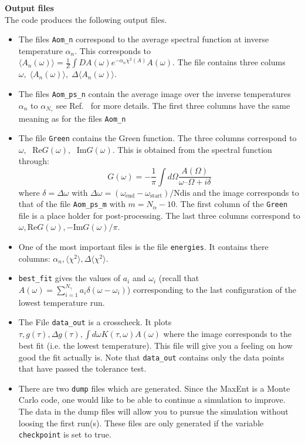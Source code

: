 \noindent
\textbf{Output files} \\
The code produces  the following output files.
\begin{itemize}
\item The files  \texttt{Aom\_n}  correspond to the average spectral function at inverse  temperature  $ \alpha_n $. This corresponds to
$  \langle A_n(\omega) \rangle =   \frac{1}{Z}   \int DA(\omega)    e^{-\alpha_n \chi^{2}(A)  } A(\omega). $
The file contains three colums  $ \omega, \;  \langle A_n(\omega) \rangle , \;  \Delta \langle A_n(\omega) \rangle $.

\item The files \texttt{Aom\_ps\_n}   contain the average image over  the  inverse   temperatures  $ \alpha_n $ to $ \alpha_{N_\gamma} $  see Ref.~\cite{Beach04a} for more details.   
 The first three columns have the same meaning as for the files \texttt{Aom\_n}

\item The file \texttt{Green} contains the Green function. The three columns correspond to $ \omega, \;   \text{ Re} G(\omega), \;  \text{  Im} G(\omega)  $.  This is obtained from the spectral function through:
\begin{equation}
 G(\omega) =  -\frac{1}{\pi} \int d \Omega   \frac{A(\Omega)}{\omega – \Omega + i \delta}
 \end{equation}
where  $ \delta =  \Delta \omega$ with $ \Delta \omega = (\omega_\text{end} -  \omega_\text{start})/\text{Ndis}$ and the image corresponds to that of the file \texttt{Aom\_ps\_m} with $ m = N_{\alpha} -10 $. 
The first column of the  \texttt{Green}  file is a place holder for post-processing. The last three columns   correspond to $\omega, \text{Re} G(\omega) ,   - \text{Im} G(\omega)/\pi $. 

\item  One of the most important files is the file  \texttt{energies}. It contains there columns:  $ \alpha_n, \langle \chi^2 \rangle, \Delta \langle \chi^2 \rangle $.

\item   \texttt{best\_fit}  gives the values of $a_i$ and $\omega_i$   (recall that $ A(\omega)  = \sum_{i=1}^{N_{\gamma}} a_{i} \delta \left( \omega - \omega_i \right)$) corresponding to the last configuration of the  lowest temperature run.

\item  The File \texttt{data\_out}  is a crosscheck. It plots   $ \tau,  g(\tau),  \Delta g(\tau), \int d \omega  K(\tau, \omega) A(\omega) $ where the image  corresponds to the best fit (i.e. the lowest temperature). 
This file will give you  a feeling on how good the fit actually is.  Note that  \texttt{data\_out} contains only the data points that have  passed the tolerance test. 


\item There are two \texttt{dump} files which are generated. Since  the MaxEnt is a  Monte Carlo code, one  would like to be able to continue a simulation to improve. The data in the dump files will allow you to pursue the simulation without loosing the first run(s).   These files are  only generated if the variable  \texttt{checkpoint} is set to true. 
 \end{itemize}

